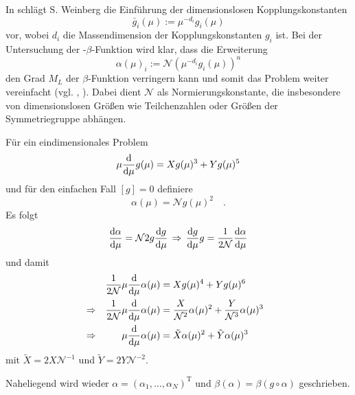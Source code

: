       In \cite{General_relativity} schlägt S. Weinberg die Einführung der dimensionslosen 
      Kopplungskonstanten
      \begin{equation}
       \bar{g}_i(\mu):= \mu^{-d_i} g_i(\mu)
      \end{equation}
      vor, wobei $d_i$ die Massendimension der Kopplungskonstanten $g_i$ ist. Bei der 
      Untersuchung der \QCDxdQCD-$\beta$-Funktion wird klar, dass die Erweiterung 
      \begin{equation}
       \alpha(\mu)_i:= \mathcal{N} \left(\mu^{-d_i} g_i(\mu)\right)^n
      \end{equation}
      den Grad $M_L$ der $\beta$-Funktion verringern kann und somit das Problem weiter 
      vereinfacht (vgl. \cite{Scale_of_dark_QCD}, \cite{Asymptotic_safety_guaranteed}). Dabei 
      dient $\mathcal{N}$ als Normierungskonstante, die insbesondere von dimensionslosen 
      Größen wie Teilchenzahlen oder Größen der Symmetriegruppe abhängen.
      \begin{beispiel}
	  Für ein eindimensionales Problem
	  \begin{equation}
	  \mu \frac{\text{d}}{\text{d} \mu} g(\mu) = X g(\mu)^3 + Y g(\mu)^5
	  \end{equation}
	  und für den einfachen Fall $[g]=0$ definiere 
	  \begin{equation}
	  \alpha(\mu) =\mathcal{N} g(\mu)^2 \quad .
	  \end{equation}
	  Es folgt
	\begin{equation}
	\frac{\text{d} \alpha}{\text{d} \mu}=\mathcal{N} 2 g \frac{\text{d} g}{\text{d} \mu} 
	\,\Rightarrow \, \frac{\text{d} g}{\text{d} \mu} g=\frac{1}{2\mathcal{N}} 
	\frac{\text{d} \alpha}{\text{d} \mu}
	\end{equation}
	und damit 
	\begin{align}
	 &&\frac{1}{2\mathcal{N}} \mu \frac{\text{d}}{\text{d} \mu} \alpha(\mu) &= 
	 X g(\mu)^4 +Yg(\mu)^6 &\\
	 &\Rightarrow&\frac{1}{2\mathcal{N}} \mu \frac{\text{d}}{\text{d} \mu} \alpha(\mu) &= 
	 \frac{X}{\mathcal{N}^2} \alpha(\mu)^2 + \frac{Y}{\mathcal{N}^3} \alpha(\mu)^3 &\\
	 &\Rightarrow& \mu \frac{\text{d}}{\text{d} \mu} \alpha(\mu) &=\tilde{X}\alpha(\mu)^2+\tilde{Y}
	 \alpha(\mu)^3 &
	\end{align}
	mit $\tilde{X}=2X\mathcal{N}^{-1}$ und $\tilde{Y}=2Y\mathcal{N}^{-2}$.
    \end{beispiel}
    Naheliegend wird wieder $\alpha=(\alpha_1,\ldots,\alpha_N)^\text{T}$ und 
    $\beta(\alpha)=\beta(g\circ\alpha)$ geschrieben.
    
